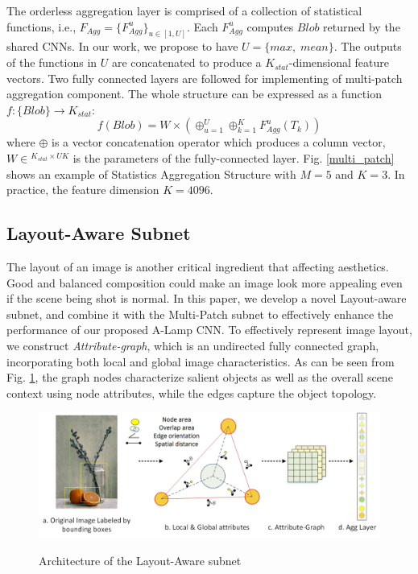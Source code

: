 \documentclass[10pt,twocolumn,letterpaper]{article}
\begin{document}
The orderless aggregation layer is comprised of a collection of statistical functions, 
i.e., ${F_{Agg}} = {\{ F_{Agg}^u\} _{u \in [1,U]}}$. Each $F_{Agg}^u$ computes
$Blob$ returned by the shared CNNs. In our work, we propose to have $U = \{ max,\;mean\} $. 
The outputs of the functions in $U$ are concatenated to produce a ${K_{stat}}$-dimensional feature vectors. Two fully connected layers are followed for implementing of multi-patch
aggregation component. The whole structure can be expressed as a function 
$f:\{ Blob\}  \to {{{K_{stat}}}}$:
\begin{equation}
f(Blob) = W \times ( \oplus _{u = 1}^U \oplus _{k = 1}^KF_{Agg}^u({T_k}))
\end{equation}
where $ \oplus$ is a vector concatenation operator which produces a column vector, $W \in {^{{K_{stat}} \times UK}}$ is the parameters of the fully-connected layer. 
Fig. \ref{multi_patch} shows an example of Statistics Aggregation Structure with $M = 5$ and $K=3$. In practice, the feature dimension $K=4096$.

\subsection{Layout-Aware Subnet}
The layout of an image is another critical ingredient that
affecting aesthetics. Good and balanced composition could make an 
image look more appealing even if the scene being shot is normal. 
In this paper, we develop a novel Layout-aware subnet, and combine it with the Multi-Patch subnet to effectively enhance the performance of our proposed A-Lamp CNN. To effectively represent image layout, we construct \textit{Attribute-graph}, which is an undirected fully connected graph, incorporating both local and global image characteristics. As can be seen from Fig. \ref{layout}, the graph nodes characterize salient objects as well as the overall scene context using node attributes,  while the edges capture the object topology. 

\begin{figure}
	\centering
	\includegraphics[scale=0.45]{figures/layout_graph.jpg}
	\label{layout}
	\caption{Architecture of the Layout-Aware subnet}
\end{figure}
\end{document}
